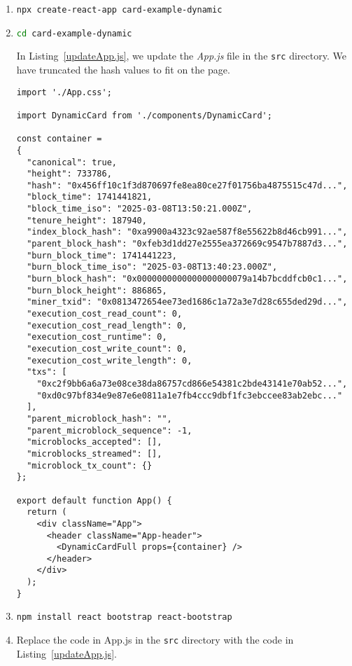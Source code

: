 \documentclass[12pt]{article}
\begin{document}
\begin{enumerate}

\item
\lstinline[language=bash]|npx create-react-app card-example-dynamic|

\item
\lstinline[language=bash]|cd card-example-dynamic|


In Listing~\ref{updateApp.js}, we update the {\em App.js} file in the \lstinline[language=bash]|src| directory.
We have truncated the hash values to fit on the page.

\begin{lstlisting}[label=updateApp.js,style=JSES6Base, caption={Update app.js in the {\em src} folder for a Stacks block}]
import './App.css';

import DynamicCard from './components/DynamicCard';

const container = 
{
  "canonical": true,
  "height": 733786,
  "hash": "0x456ff10c1f3d870697fe8ea80ce27f01756ba4875515c47d...",
  "block_time": 1741441821,
  "block_time_iso": "2025-03-08T13:50:21.000Z",
  "tenure_height": 187940,
  "index_block_hash": "0xa9900a4323c92ae587f8e55622b8d46cb991...",
  "parent_block_hash": "0xfeb3d1dd27e2555ea372669c9547b7887d3...",
  "burn_block_time": 1741441223,
  "burn_block_time_iso": "2025-03-08T13:40:23.000Z",
  "burn_block_hash": "0x0000000000000000000079a14b7bcddfcb0c1...",
  "burn_block_height": 886865,
  "miner_txid": "0x0813472654ee73ed1686c1a72a3e7d28c655ded29d...",
  "execution_cost_read_count": 0,
  "execution_cost_read_length": 0,
  "execution_cost_runtime": 0,
  "execution_cost_write_count": 0,
  "execution_cost_write_length": 0,
  "txs": [
    "0xc2f9bb6a6a73e08ce38da86757cd866e54381c2bde43141e70ab52...",
    "0xd0c97bf834e9e87e6e0811a1e7fb4ccc9dbf1fc3ebccee83ab2ebc..."
  ],
  "parent_microblock_hash": "",
  "parent_microblock_sequence": -1,
  "microblocks_accepted": [],
  "microblocks_streamed": [],
  "microblock_tx_count": {}
};

export default function App() {
  return (
    <div className="App">
      <header className="App-header">  
        <DynamicCardFull props={container} /> 
      </header>
    </div>
  );
}
\end{lstlisting}

\item
\lstinline[language=bash]|npm install react bootstrap react-bootstrap|

\item Replace the code in App.js in the \lstinline[language=bash]|src| directory with the code
in Listing~\ref{updateApp.js}.

\end{enumerate}
\end{document}
